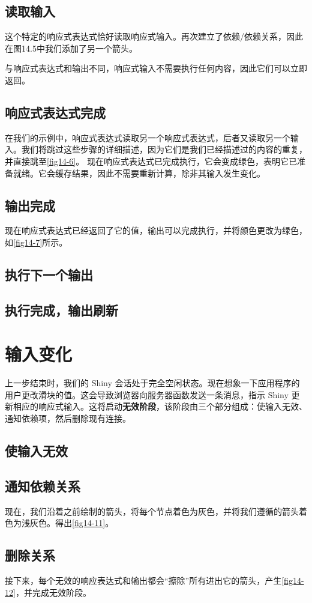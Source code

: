\subsection{读取输入}
这个特定的响应式表达式恰好读取响应式输入。再次建立了依赖/依赖关系，因此在图14.5中我们添加了另一个箭头。

与响应式表达式和输出不同，响应式输入不需要执行任何内容，因此它们可以立即返回。
\subsection{响应式表达式完成}
在我们的示例中，响应式表达式读取另一个响应式表达式，后者又读取另一个输入。我们将跳过这些步骤的详细描述，因为它们是我们已经描述过的内容的重复，并直接跳至\autoref{fig14-6}。
现在响应式表达式已完成执行，它会变成绿色，表明它已准备就绪。它会缓存结果，因此不需要重新计算，除非其输入发生变化。
\subsection{输出完成}
现在响应式表达式已经返回了它的值，输出可以完成执行，并将颜色更改为绿色，如\autoref{fig14-7}所示。
\subsection{执行下一个输出}
\subsection{执行完成，输出刷新}
\section{输入变化}
上一步结束时，我们的 Shiny 会话处于完全空闲状态。现在想象一下应用程序的用户更改滑块的值。这会导致浏览器向服务器函数发送一条消息，指示 Shiny 更新相应的响应式输入。这将启动\textbf{无效阶段}，该阶段由三个部分组成：使输入无效、通知依赖项，然后删除现有连接。
\subsection{使输入无效}
\subsection{通知依赖关系}
现在，我们沿着之前绘制的箭头，将每个节点着色为灰色，并将我们遵循的箭头着色为浅灰色。得出\autoref{fig14-11}。
\subsection{删除关系\label{14.4.3}}
接下来，每个无效的响应表达式和输出都会“擦除”所有进出它的箭头，产生\autoref{fig14-12}，并完成无效阶段。

